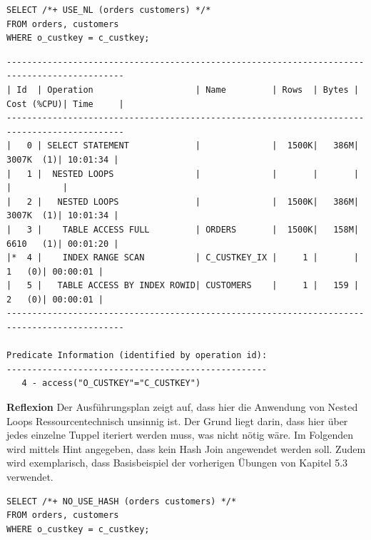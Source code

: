 \documentclass[10pt]{article}
\begin{document}
\begin{lstlisting}[style=sql]
SELECT /*+ USE_NL (orders customers) */*
FROM orders, customers
WHERE o_custkey = c_custkey;
\end{lstlisting}
\begin{lstlisting}[style=queryexecutionplan]
---------------------------------------------------------------------------------------------
| Id  | Operation                    | Name         | Rows  | Bytes | Cost (%CPU)| Time     |
---------------------------------------------------------------------------------------------
|   0 | SELECT STATEMENT             |              |  1500K|   386M|  3007K  (1)| 10:01:34 |
|   1 |  NESTED LOOPS                |              |       |       |            |          |
|   2 |   NESTED LOOPS               |              |  1500K|   386M|  3007K  (1)| 10:01:34 |
|   3 |    TABLE ACCESS FULL         | ORDERS       |  1500K|   158M|  6610   (1)| 00:01:20 |
|*  4 |    INDEX RANGE SCAN          | C_CUSTKEY_IX |     1 |       |     1   (0)| 00:00:01 |
|   5 |   TABLE ACCESS BY INDEX ROWID| CUSTOMERS    |     1 |   159 |     2   (0)| 00:00:01 |
---------------------------------------------------------------------------------------------
 
Predicate Information (identified by operation id):
---------------------------------------------------
   4 - access("O_CUSTKEY"="C_CUSTKEY")
\end{lstlisting}
\textbf{Reflexion} \newline
Der Ausführungsplan zeigt auf, dass hier die Anwendung von Nested Loops Ressourcentechnisch unsinnig ist.
Der Grund liegt darin, dass hier über jedes einzelne Tuppel iteriert werden muss, was nicht nötig wäre. \newline
\newline
Im Folgenden wird mittels Hint angegeben, dass kein Hash Join angewendet werden soll.\newline
Zudem wird exemplarisch, dass Basisbeispiel der vorherigen Übungen von Kapitel 5.3 verwendet.
\begin{lstlisting}[style=sql]
SELECT /*+ NO_USE_HASH (orders customers) */*
FROM orders, customers
WHERE o_custkey = c_custkey;
\end{lstlisting}
\end{document}
